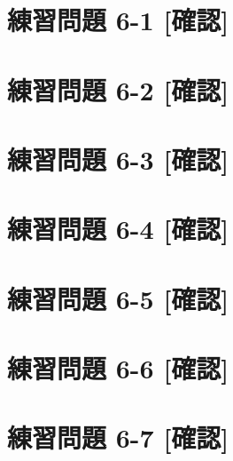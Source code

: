 \documentclass[
]{book}
\begin{document}
\hypertarget{ux7df4ux7fd2ux554fux984c-6-1-ux78baux8a8d}{%
\section*{練習問題 6-1 {[}確認{]}}\label{ux7df4ux7fd2ux554fux984c-6-1-ux78baux8a8d}}

\hypertarget{ux7df4ux7fd2ux554fux984c-6-2-ux78baux8a8d}{%
\section*{練習問題 6-2 {[}確認{]}}\label{ux7df4ux7fd2ux554fux984c-6-2-ux78baux8a8d}}

\hypertarget{ux7df4ux7fd2ux554fux984c-6-3-ux78baux8a8d}{%
\section*{練習問題 6-3 {[}確認{]}}\label{ux7df4ux7fd2ux554fux984c-6-3-ux78baux8a8d}}

\hypertarget{ux7df4ux7fd2ux554fux984c-6-4-ux78baux8a8d}{%
\section*{練習問題 6-4 {[}確認{]}}\label{ux7df4ux7fd2ux554fux984c-6-4-ux78baux8a8d}}

\hypertarget{ux7df4ux7fd2ux554fux984c-6-5-ux78baux8a8d}{%
\section*{練習問題 6-5 {[}確認{]}}\label{ux7df4ux7fd2ux554fux984c-6-5-ux78baux8a8d}}

\hypertarget{ux7df4ux7fd2ux554fux984c-6-6-ux78baux8a8d}{%
\section*{練習問題 6-6 {[}確認{]}}\label{ux7df4ux7fd2ux554fux984c-6-6-ux78baux8a8d}}

\hypertarget{ux7df4ux7fd2ux554fux984c-6-7-ux78baux8a8d}{%
\section*{練習問題 6-7 {[}確認{]}}\label{ux7df4ux7fd2ux554fux984c-6-7-ux78baux8a8d}}
\end{document}
